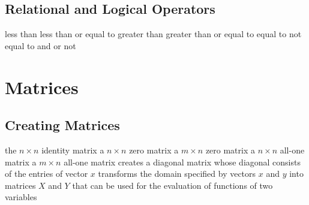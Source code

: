 \subsection{Relational and Logical Operators}{}
\cmdOper{<}	{less than}
\cmdOper{<==}	{less than or equal to}
\cmdOper{>}	{greater than}
\cmdOper{>==}	{greater than or equal to}
\cmdOper{==}	{equal to}
\cmdOper{\tild=}	{not equal to}
\cmdOper{\&}	{and}
\cmdOper{!}	{or}
\cmdOper{\tild}	{not}

\section{Matrices}{}

\subsection{Creating Matrices}{}
	{the $n \times n$ identity matrix}
	{a $n \times n$ zero matrix}
	{a $m \times n$ zero matrix}
	{a $n \times n$ all-one matrix}
	{a $m \times n$ all-one matrix}
	{creates a diagonal matrix whose diagonal consists of the entries of vector $x$}
	{transforms the domain specified by vectors $x$ and $y$ into matrices
    $X$ and $Y$ that can be used for the evaluation of functions of two variables}

